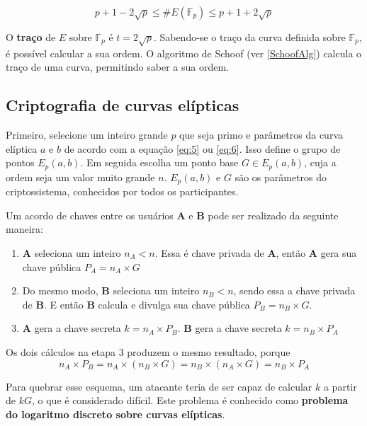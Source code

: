 \begin{equation}
p + 1 - 2\sqrt{p} \leq \#E(\mathbb{F}_p) \leq p + 1 + 2\sqrt{p}
\label{eq:HasseBounds}
\end{equation}

O \textbf{traço} de $E$ sobre $\mathbb{F}_p$ é $t = 2\sqrt{p}$. Sabendo-se o traço da curva definida sobre $\mathbb{F}_p$, é possível calcular a sua ordem. O algoritmo de Schoof (ver \ref{SchoofAlg}) calcula o traço de uma curva, permitindo saber a sua ordem.

%
%
\subsection{Criptografia de curvas elípticas} \label{sec:ecc}
Primeiro, selecione um inteiro grande \(p\) que seja primo e parâmetros da curva elíptica \(a\) e \(b\) de acordo com a equação \ref{eq:5} ou \ref{eq:6}. Isso define o grupo de pontos $E_p(a, b)$. Em seguida escolha um ponto base $G \in E_p(a, b)$, cuja a ordem seja um valor muito grande \(n\). $E_p(a, b)$ e \(G\) são os parâmetros do criptossistema, conhecidos por todos os participantes.

Um acordo de chaves entre os usuários \textbf{A} e \textbf{B} pode ser realizado da seguinte maneira:
\begin{enumerate}
\item \textbf{A} seleciona um inteiro \(n_A < n\). Essa é chave privada de \textbf{A}, então \textbf{A} gera sua chave pública $P_A = n_A \times G$
\item Do mesmo modo, \textbf{B} seleciona um inteiro \(n_B < n\), sendo essa a chave privada de \textbf{B}. E então \textbf{B} calcula e divulga sua chave pública $P_B = n_B \times G$.
\item \textbf{A} gera a chave secreta $k = n_A \times P_B$. \textbf{B} gera a chave secreta $k = n_B \times P_A$
\end{enumerate}

Os dois cálculos na etapa 3 produzem o mesmo resultado, porque
\begin{equation*}
n_A \times P_B = n_A \times (n_B \times G) = n_B \times (n_A \times G) = n_B \times P_A
\end{equation*}

Para quebrar esse esquema, um atacante teria de ser capaz de calcular \(k\) a partir de \(kG\), o que é considerado difícil. Este problema é conhecido como \textbf{problema do logaritmo discreto sobre curvas elípticas}.
